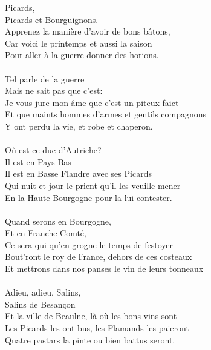 
 Picards,
\\Picards et Bourguignons.
\\Apprenez la manière d'avoir de bons bâtons,
\\Car voici le printemps et aussi la saison
\\Pour aller à la guerre donner des horions.
\\\\Tel parle de la guerre
\\Mais ne sait pas que c'est:
\\Je vous jure mon âme que c'est un piteux faict
\\Et que maints hommes d'armes et gentils compagnons
\\Y ont perdu la vie, et robe et chaperon.
\\\\Où est ce duc d'Autriche?
\\Il est en Pays-Bas
\\Il est en Basse Flandre avec ses Picards
\\Qui nuit et jour le prient qu'il les veuille mener
\\En la Haute Bourgogne pour la lui contester.
\\\\Quand serons en Bourgogne,
\\Et en Franche Comté,
\\Ce sera qui-qu'en-grogne le temps de festoyer
\\Bout'ront le roy de France, dehors de ces costeaux
\\Et mettrons dans nos panses le vin de leurs tonneaux
\\\\Adieu, adieu, Salins,
\\Salins de Besançon
\\Et la ville de Beaulne, là où les bons vins sont
\\Les Picards les ont bus, les Flamands les paieront
\\Quatre pastars la pinte ou bien battus seront.
